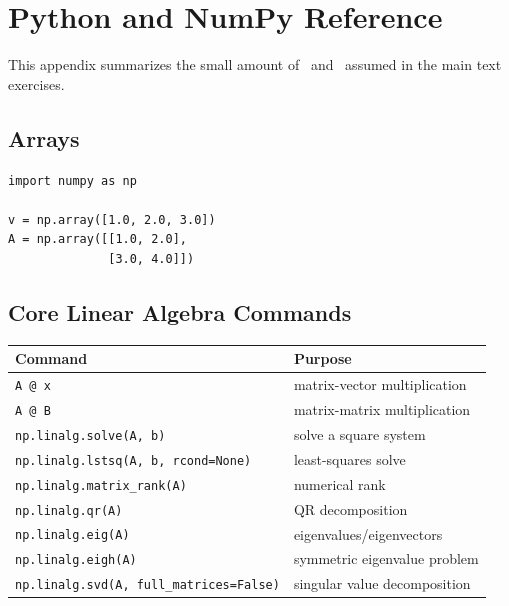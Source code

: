 \chapter{Python and NumPy Reference}
\label{app:python-numpy}

This appendix summarizes the small amount of \Python\ and \NumPy\ assumed in
the main text exercises.

\section{Arrays}

\begin{lstlisting}
import numpy as np

v = np.array([1.0, 2.0, 3.0])
A = np.array([[1.0, 2.0],
              [3.0, 4.0]])
\end{lstlisting}

\section{Core Linear Algebra Commands}

\begin{center}
\begin{tabular}{ll}
\toprule
Command & Purpose \\
\midrule
\texttt{A @ x} & matrix-vector multiplication \\
\texttt{A @ B} & matrix-matrix multiplication \\
\texttt{np.linalg.solve(A, b)} & solve a square system \\
\texttt{np.linalg.lstsq(A, b, rcond=None)} & least-squares solve \\
\texttt{np.linalg.matrix\_rank(A)} & numerical rank \\
\texttt{np.linalg.qr(A)} & QR decomposition \\
\texttt{np.linalg.eig(A)} & eigenvalues/eigenvectors \\
\texttt{np.linalg.eigh(A)} & symmetric eigenvalue problem \\
\texttt{np.linalg.svd(A, full\_matrices=False)} & singular value decomposition \\
\bottomrule
\end{tabular}
\end{center}
